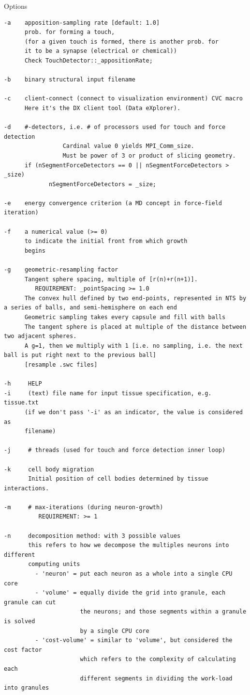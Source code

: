 Options
\begin{verbatim}
-a    apposition-sampling rate [default: 1.0]
      prob. for forming a touch, 
      (for a given touch is formed, there is another prob. for
      it to be a synapse (electrical or chemical))
      Check TouchDetector::_appositionRate;

-b    binary structural input filename

-c    client-connect (connect to visualization environment) CVC macro
      Here it's the DX client tool (Data eXplorer).

-d    #-detectors, i.e. # of processors used for touch and force detection 
                 Cardinal value 0 yields MPI_Comm_size. 
                 Must be power of 3 or product of slicing geometry.
      if (nSegmentForceDetectors == 0 || nSegmentForceDetectors > _size)
             nSegmentForceDetectors = _size;
        
-e    energy convergence criterion (a MD concept in force-field iteration)

-f    a numerical value (>= 0) 
      to indicate the initial front from which growth
      begins
      
-g    geometric-resampling factor
      Tangent sphere spacing, multiple of [r(n)+r(n+1)].
         REQUIREMENT: _pointSpacing >= 1.0 
      The convex hull defined by two end-points, represented in NTS by a series of balls, and semi-hemisphere on each end
      Geometric sampling takes every capsule and fill with balls
      The tangent sphere is placed at multiple of the distance between two adjacent spheres.
      A g=1, then we multiply with 1 [i.e. no sampling, i.e. the next ball is put right next to the previous ball]
      [resample .swc files]
                 
-h     HELP
-i     (text) file name for input tissue specification, e.g. tissue.txt
      (if we don't pass '-i' as an indicator, the value is considered as
      filename)
      
-j     # threads (used for touch and force detection inner loop)

-k     cell body migration 
       Initial position of cell bodies determined by tissue interactions.

-m     # max-iterations (during neuron-growth)
          REQUIREMENT: >= 1
          
-n     decomposition method: with 3 possible values
       this refers to how we decompose the multiples neurons into different
       computing units
         - 'neuron' = put each neuron as a whole into a single CPU core
         - 'volume' = equally divide the grid into granule, each granule can cut 
                      the neurons; and those segments within a granule is solved 
                      by a single CPU core
         - 'cost-volume' = similar to 'volume', but considered the cost factor
                      which refers to the complexity of calculating each
                      different segments in dividing the work-load into granules
       

\end{verbatim}
